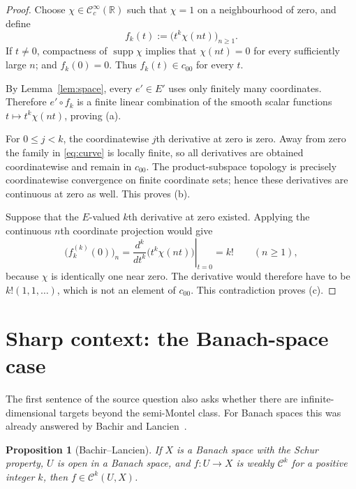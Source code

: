 \documentclass[10pt]{article}
\newtheorem{proposition}{Proposition}
\newcommand{\R}{\mathbb R}
\newcommand{\Ck}{\mathcal C}
\begin{document}
\begin{proof}
Choose $\chi\in\Ck_c^\infty(\R)$ such that $\chi=1$ on a neighbourhood of
zero, and define
\begin{equation}\label{eq:curve}
  f_k(t):=\bigl(t^k\chi(nt)\bigr)_{n\geq1}.
\end{equation}
If $t\ne0$, compactness of $\operatorname{supp}\chi$ implies that
$\chi(nt)=0$ for every sufficiently large $n$; and $f_k(0)=0$. Thus
$f_k(t)\in c_{00}$ for every $t$.

By Lemma~\ref{lem:space}, every $e'\in E'$ uses only finitely many
coordinates. Therefore $e'\circ f_k$ is a finite linear combination of the
smooth scalar functions $t\mapsto t^k\chi(nt)$, proving (a).

For $0\leq j<k$, the coordinatewise $j$th derivative at zero is zero. Away
from zero the family in \eqref{eq:curve} is locally finite, so all derivatives
are obtained coordinatewise and remain in $c_{00}$. The product-subspace
topology is precisely coordinatewise convergence on finite coordinate sets;
hence these derivatives are continuous at zero as well. This proves (b).

Suppose that the $E$-valued $k$th derivative at zero existed. Applying the
continuous $n$th coordinate projection would give
\[
 \bigl(f_k^{(k)}(0)\bigr)_n
 =\left.\frac{d^k}{dt^k}\bigl(t^k\chi(nt)\bigr)\right|_{t=0}
 =k!
 \qquad(n\geq1),
\]
because $\chi$ is identically one near zero. The derivative would therefore
have to be $k!(1,1,\ldots)$, which is not an element of $c_{00}$. This
contradiction proves (c).
\end{proof}

\section{Sharp context: the Banach-space case}

The first sentence of the source question also asks whether there are
infinite-dimensional targets beyond the semi-Montel class. For Banach spaces
this was already answered by Bachir and Lancien~\cite{bachir-lancien}.

\begin{proposition}[Bachir--Lancien]
If $X$ is a Banach space with the Schur property, $U$ is open in a Banach
space, and $f:U\to X$ is weakly $\Ck^k$ for a positive integer $k$, then
$f\in\Ck^k(U,X)$.
\end{proposition}
\end{document}
